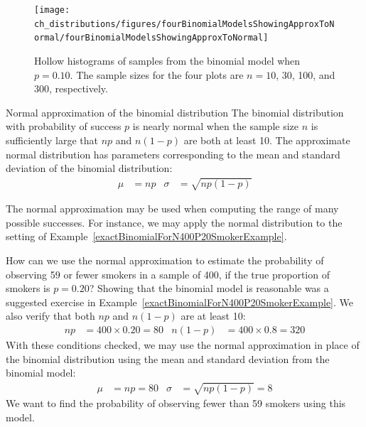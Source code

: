 \begin{figure}[h]
\centering
\texttt{[image: ch\_distributions/figures/fourBinomialModelsShowingApproxToNormal/fourBinomialModelsShowingApproxToNormal]}
\caption{Hollow histograms of samples from the binomial model when $p=0.10$. The sample sizes for the four plots are $n=10$, 30, 100, and 300, respectively.}
\label{fourBinomialModelsShowingApproxToNormal}
\end{figure}

\begin{onebox}{Normal approximation of the binomial distribution}
  The binomial distribution with probability of success
  $p$ is nearly normal when the sample size $n$ is
  sufficiently large that $np$ and $n(1-p)$ are both
  at least 10.
  The approximate normal distribution has parameters
  corresponding to the mean and standard deviation of
  the binomial distribution:\vspace{-1.5mm}
  \begin{align*}
  \mu &= np
      &\sigma& = \sqrt{np(1-p)}
  \end{align*}
\end{onebox}

The normal approximation may be used when computing the range of many possible successes. For instance, we may apply the normal distribution to the setting of Example~\ref{exactBinomialForN400P20SmokerExample}.

\begin{examplewrap}
\begin{nexample}{How can we use the normal approximation to estimate the probability of observing 59 or fewer smokers in a sample of 400, if the true proportion of smokers is $p=0.20$?} \label{approxBinomialForN400P20SmokerExample}
Showing that the binomial model is reasonable was a suggested exercise in Example~\ref{exactBinomialForN400P20SmokerExample}. We also verify that both $np$ and $n(1-p)$ are at least 10:
\begin{align*}
np&=400\times 0.20=80
&n(1-p)&=400\times 0.8=320
\end{align*}
With these conditions checked, we may use the normal approximation in place of the binomial distribution using the mean and standard deviation from the binomial model:
\begin{align*}
\mu &= np = 80
&\sigma &= \sqrt{np(1-p)} = 8
\end{align*}
We want to find the probability of observing fewer than 59 smokers using this model.
\end{nexample}
\end{examplewrap}

